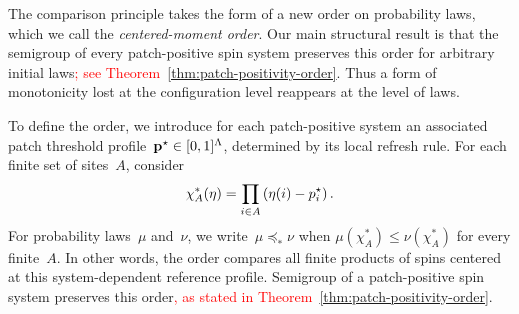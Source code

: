 %
%
%

The comparison principle takes the form of a new order on probability laws,
which we call the \emph{centered-moment order}. Our main structural result is
that the semigroup of every patch-positive spin system preserves this order for
arbitrary initial laws\textcolor{red}{; see
Theorem~\ref{thm:patch-positivity-order}}. Thus a form of monotonicity lost at
the configuration
level reappears at the level of laws.

%
%
%
%

To define the order, we introduce for each patch-positive system an associated patch threshold profile~$\mathbf{p}^\star\in [0,1]^\Lambda$,
determined by its local refresh rule. For each finite set of sites~$A$, consider
\begin{equation*}
\chi_A^*(\eta)
=
\prod_{i\in A}\left(\eta(i)-p_i^\star\right).
\end{equation*}
For probability laws~$\mu$ and~$\nu$, we write~$\mu\preceq_*\nu$ when
$\mu(\chi_A^*)\leq\nu(\chi_A^*)$ for every finite~$A$. In other words, the
order compares all finite products of spins centered at this system-dependent
reference profile. Semigroup of a patch-positive spin system preserves this
order\textcolor{red}{, as stated in
Theorem~\ref{thm:patch-positivity-order}}.

